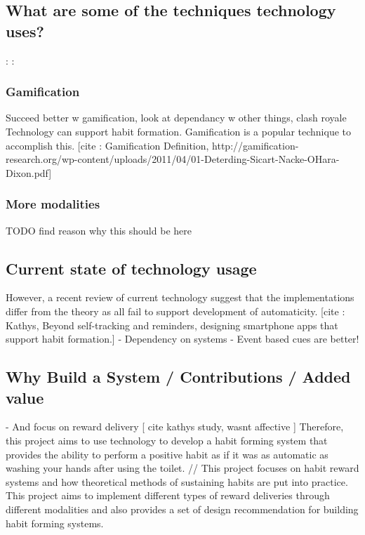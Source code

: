 \subsection*{What are some of the techniques technology uses?}

:\newline
:

\subsubsection*{Gamification}
Succeed better w gamification, look at dependancy w other things, clash royale
Technology can support habit formation. Gamification is a popular technique to accomplish this. [cite : Gamification Definition, http://gamification-research.org/wp-content/uploads/2011/04/01-Deterding-Sicart-Nacke-OHara-Dixon.pdf]

\subsubsection*{More modalities}
TODO find reason why this should be here


\subsection*{Current state of technology usage}

However, a recent review of current technology suggest that the implementations differ from the theory as all fail to support development of automaticity. [cite : Kathys, Beyond self-tracking and reminders, designing smartphone apps that support habit formation.]
- Dependency on systems
- Event based cues are better!

\subsection*{Why Build a System / Contributions / Added value}

- And focus on reward delivery [ cite kathys study, wasnt affective ]
Therefore, this project aims to use technology to develop a habit forming system that provides the ability to perform a positive habit as if it was as automatic as washing your hands after using the toilet. // This project focuses on habit reward systems and how theoretical methods of sustaining habits are put into practice. This project aims to implement different types of reward deliveries through different modalities and also provides a set of design recommendation for building habit forming systems.

